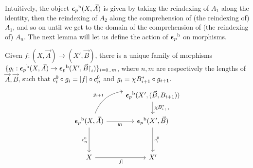 \documentclass{lmcs} %
\theoremstyle{plain}\newtheorem{satz}[thm]{Satz} %
\begin{document}
			Intuitively, the object ${\boldsymbol{\epsilon}_p}^{\mathrm{b}}(X,\vec{A})$ is given by taking the reindexing of $A_1$ along the identity, then the reindexing of $A_2$ along the comprehension of (the reindexing of) $A_1$, and so on until we get to the domain of the comprehension of (the reindexing of) $A_n$. The next lemma will let us define the action of ${\boldsymbol{\epsilon}_p}^{\mathrm{b}}$ on morphisms.
			
			\begin{lem}\label{lem:Cdef}
				Given $f:(X,\vec{A})\rightarrow(X',\vec{B})$, there is a unique family of morphisms $\{g_{i}:{\boldsymbol{\epsilon}_p}^{\mathrm{b}}(X,\vec{A})\to {\boldsymbol{\epsilon}_p}^{\mathrm{b}}(X',\vec{B}\mathord{\restriction}_i)\}_{i=0..m}$, where $n,m$ are respectively the lengths of $\vec{A},\vec{B}$, such that $c^{0}_{i}\circ g_i=|f|\circ c^{0}_{n}$ and $g_i=\chi^{}B_{i+1}^*\circ g_{i+1}$.
				\[\begin{tikzcd}
					& {\fb{\twont{\epsilon}_p}(X',(\vec{B},B_{i+1}))} \\
					{\fb{\twont{\epsilon}_p}(X,\vec{A})} & {\fb{\twont{\epsilon}_p}(X',\vec{B})} \\
					\\
					X & {X'}
					\arrow["{\chi B_{i+1}^*}", from=1-2, to=2-2]
					\arrow["{g_{i+1}}", from=2-1, to=1-2, bend left]
					\arrow["{g_i}"', from=2-1, to=2-2]
					\arrow["{\C{0}{n}}"', from=2-1, to=4-1]
					\arrow["{\C{0}{i}}", from=2-2, to=4-2]
					\arrow["{\fp{f}}"', from=4-1, to=4-2]
				\end{tikzcd}\]
			\end{lem}
			
\end{document}
